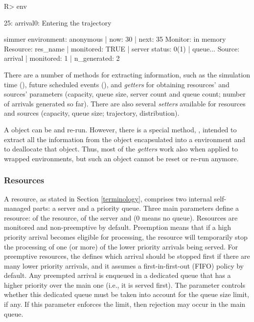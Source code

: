 \documentclass[
  nojss]{jss}
\begin{document}
\begin{CodeChunk}
\begin{CodeInput}
R> env %
\end{CodeInput}
\begin{CodeOutput}
25: arrival0: Entering the trajectory
\end{CodeOutput}
\begin{CodeOutput}
simmer environment: anonymous | now: 30 | next: 35
{ Monitor: in memory }
{ Resource: res_name | monitored: TRUE | server status: 0(1) | queue... }
{ Source: arrival | monitored: 1 | n_generated: 2 }
\end{CodeOutput}
\end{CodeChunk}

There are a number of methods for extracting information, such as the
simulation time (), future scheduled events (),
and \emph{getters} for obtaining resources' and sources' parameters
(capacity, queue size, server count and queue count; number of arrivals
generated so far). There are also several \emph{setters} available for
resources and sources (capacity, queue size; trajectory, distribution).

A  object can be  and re-run. However, there
is a special method, , intended to extract all the
information from the  object encapsulated into a
 environment and to deallocate that object. Thus, most of
the \emph{getters} work also when applied to wrapped environments, but
such an object cannot be reset or re-run anymore.

\hypertarget{resources}{%
\subsubsection{Resources}\label{resources}}

A  resource, as stated in Section \ref{terminology},
comprises two internal self-managed parts: a server and a priority
queue. Three main parameters define a resource:  of the
resource,  of the server and  (0 means
no queue). Resources are monitored and non-preemptive by default.
Preemption means that if a high priority arrival becomes eligible for
processing, the resource will temporarily stop the processing of one (or
more) of the lower priority arrivals being served. For preemptive
resources, the  defines which arrival should be
stopped first if there are many lower priority arrivals, and it assumes
a first-in-first-out (FIFO) policy by default. Any preempted arrival is
enqueued in a dedicated queue that has a higher priority over the main
one (i.e., it is served first). The  parameter
controls whether this dedicated queue must be taken into account for the
queue size limit, if any. If this parameter enforces the limit, then
rejection may occur in the main queue.
\end{document}
